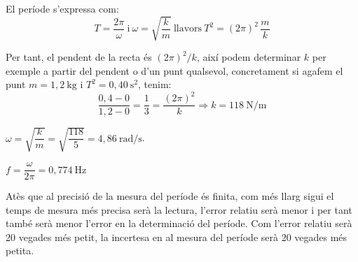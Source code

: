 \begin{solapartat}
 El període s'expressa com:
\[ T = \frac{2\pi}{\omega} \ \text{i}\ \omega = \sqrt{\frac{k}{m}}\ \text{llavors}\ T^2 = (2\pi)^2\,\frac{m}{k} \]

 Per tant, el pendent de la recta és $(2\pi)^2/k$, així podem determinar $k$ per exemple a partir del pendent o d'un punt qualsevol, concretament si agafem el punt $m = 1,2\ \mathrm{kg}$ i $T^2 = 0,40\ \mathrm{s}^2$, tenim:
\[ \frac{0,4-0}{1,2-0} = \frac{1}{3} = \frac{(2\pi)^2}{k} \Rightarrow k = 118\ \mathrm{N/m} \]

 $\omega = \sqrt{\dfrac{k}{m}} = \sqrt{\dfrac{118}{5}} = 4,86\ \mathrm{rad/s}$.

 $f = \dfrac{\omega}{2\pi} = 0,774\ \mathrm{Hz}$

 Atès que al precisió de la mesura del període és finita, com més llarg sigui el temps de mesura més precisa serà la lectura, l'error relatiu serà menor i per tant també serà menor l'error en la determinació del període. Com l'error relatiu serà 20 vegades més petit, la incertesa en al mesura del període serà 20 vegades més petita.
\end{solapartat}

